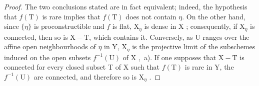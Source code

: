 \begin{proof}
The two conclusions stated are in fact equivalent;
indeed, the hypothesis that $f(\mathrm{T})$ is rare implies that $f(\mathrm{T})$ does not contain $\eta$.
On the other hand, since $\{\eta\}$ is proconstructible  and $f$ is flat, $\mathrm{X}_\eta$ is dense in X ; consequently, if $\mathrm{X}_\eta$ is connected, then so is $\mathrm{X}-\mathrm{T}$, which contains it.
Conversely, as U ranges over the affine open neighbourhoods of $\eta$ in Y, $\mathrm{X}_\eta$ is the projective limit of the subschemes induced on the open subsets $f^{-1}(\mathrm{U})$ of X ,~a).
If one supposes that $\mathrm{X}-\mathrm{T}$ is connected for every closed subset T of X such that $f(\mathrm{T})$ is rare in Y, the $f^{-1}(\mathrm{U})$ are connected, and therefore so is $\mathrm{X}_\eta$ .


\end{proof}
